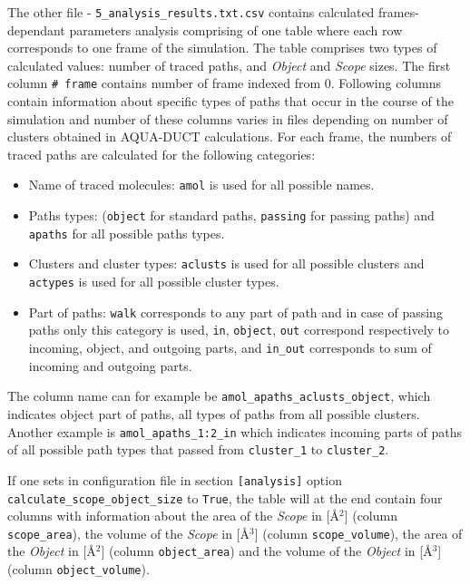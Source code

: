 \documentclass[9pt,tutorial, pubversion]{livecoms}
\begin{document}
The other file - \texttt{5\_analysis\_results.txt.csv} contains calculated frames-dependant parameters analysis comprising of one table where each row corresponds to one frame of the simulation. The table comprises two types of calculated values: number of traced paths, and \textit{Object} and \textit{Scope} sizes. The first column \texttt{\# frame} contains number of frame indexed from 0. Following columns contain information about specific types of paths that occur in the course of the simulation and number of these columns varies in files depending on number of clusters obtained in AQUA-DUCT calculations. For each frame, the numbers of traced paths are calculated for the following categories:
\begin{itemize}
\item Name of traced molecules: \texttt{amol} is used for all possible names.
\item Paths types: (\texttt{object} for standard paths, \texttt{passing} for passing paths) and \texttt{apaths} for all possible paths types.
\item Clusters and cluster types: \texttt{aclusts} is used for all possible clusters and \texttt{actypes} is used for all possible cluster types.
\item Part of paths: \texttt{walk} corresponds to any part of path and in case of passing paths only this category is used, \texttt{in}, \texttt{object}, \texttt{out} correspond respectively to incoming, object, and outgoing parts, and \texttt{in\_out} corresponds to sum of incoming and outgoing parts.
\end{itemize}
The column name can for example be \newline \texttt{amol\_apaths\_aclusts\_object}, which indicates object part of paths, all types of paths from all possible clusters. Another example is \texttt{amol\_apaths\_1:2\_in} which indicates incoming parts of paths of all possible path types that passed from \texttt{cluster\_1} to \texttt{cluster\_2}.

If one sets in configuration file in section \texttt{[analysis]} option \texttt{calculate\_scope\_object\_size} to \texttt{True}, the table will at the end contain four columns with information about the area of the \textit{Scope} in [Å\( \displaystyle ^{2}\)] (column \texttt{scope\_area}), the volume of the \textit{Scope} in [Å\( \displaystyle ^{3}\)] (column \texttt{scope\_volume}), the area of the \textit{Object} in [Å\( \displaystyle ^{2}\)] (column \texttt{object\_area}) and the volume of the \textit{Object} in [Å\( \displaystyle ^{3}\)]  (column \texttt{object\_volume}).
\end{document}
